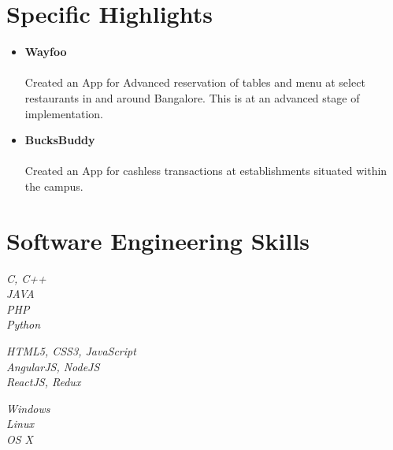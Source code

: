 \documentclass[10pt]{article} %
\begin{document}

\section{Specific Highlights}
\begin{itemize}
\item{\bf Wayfoo} \\
\\
Created an App for Advanced reservation of tables and menu at select restaurants in and around Bangalore. This is at an advanced stage of implementation. \\

\item{\bf BucksBuddy} \\
\\
Created an App for cashless transactions at establishments situated within the campus. \\
\end{itemize}



\section{Software Engineering Skills}

{
\textit{C, C++}\\
\textit{JAVA}\\
\textit{PHP}\\
\textit{Python}
}


{
\textit{HTML5, CSS3, JavaScript}\\
\textit{AngularJS, NodeJS}\\
\textit{ReactJS, Redux}\\
}


{
\textit{Windows}\\
\textit{Linux}\\
\textit{OS X \\}\\
}
\end{document}
